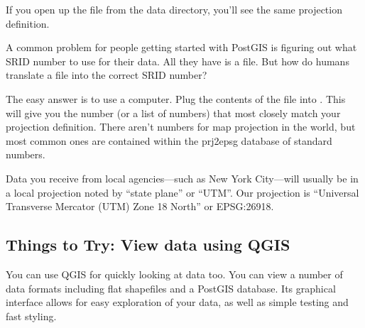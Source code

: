 \documentclass[a4paper,11pt,english]{sphinxmanual}
\begin{document}
\begin{sphinxVerbatim}[commandchars=\\\{\}]
  \PYG{p}{[}\PYG{p}{]}
  \PYG{p}{[}\PYG{p}{]}
  \PYG{p}{[}\PYG{p}{]}
  \PYG{p}{[}\PYG{p}{]}
  \PYG{p}{[}\PYG{p}{]}
  \PYG{p}{[}\PYG{p}{]}
  \PYG{p}{[}\PYG{p}{]}\PYG{p}{]}
\end{sphinxVerbatim}

If you open up the  file from the data directory, you’ll see the same projection definition.

A common problem for people getting started with PostGIS is figuring out what SRID number to use for their data. All they have is a  file. But how do humans translate a  file into the correct SRID number?

The easy answer is to use a computer.  Plug the contents of the  file into . This will give you the number (or a list of numbers) that most closely match your projection definition. There aren’t numbers for  map projection in the world, but most common ones are contained within the prj2epsg database of standard numbers.

\noindent{}

Data you receive from local agencies—such as New York City—will usually be in a local projection noted by “state plane” or “UTM”.  Our projection is “Universal Transverse Mercator (UTM) Zone 18 North” or EPSG:26918.


\subsection{Things to Try: View data using QGIS}
\label{\detokenize{setup:things-to-try-view-data-using-qgis}}
You can use QGIS for quickly looking at data too. You can view a number of data formats including flat shapefiles and a PostGIS database. Its graphical interface allows for easy exploration of your data, as well as simple testing and fast styling.
\end{document}
